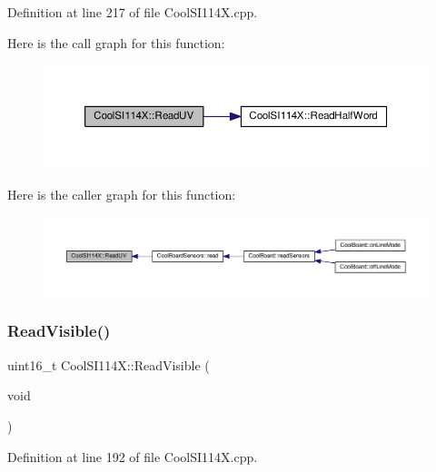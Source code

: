 Definition at line 217 of file Cool\+S\+I114\+X.\+cpp.

Here is the call graph for this function\+:\nopagebreak
\begin{figure}[H]
\begin{center}
\leavevmode
\includegraphics[width=350pt]{class_cool_s_i114_x_a14ced664d74e93438440b0274109c111_cgraph}
\end{center}
\end{figure}
Here is the caller graph for this function\+:\nopagebreak
\begin{figure}[H]
\begin{center}
\leavevmode
\includegraphics[width=350pt]{class_cool_s_i114_x_a14ced664d74e93438440b0274109c111_icgraph}
\end{center}
\end{figure}
\mbox{\label{class_cool_s_i114_x_a42e0e574256341443c647a4c0eda87d5}} 
\subsubsection{\texorpdfstring{Read\+Visible()}{ReadVisible()}}
{\footnotesize\ttfamily uint16\+\_\+t Cool\+S\+I114\+X\+::\+Read\+Visible (\begin{DoxyParamCaption}\item[{void}]{ }\end{DoxyParamCaption})}



Definition at line 192 of file Cool\+S\+I114\+X.\+cpp.

